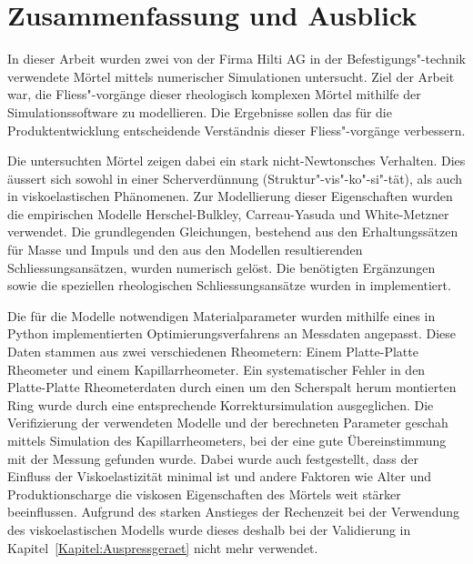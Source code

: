 \section{Zusammenfassung und Ausblick}
\label{Kapitel:Outlook}
In dieser Arbeit wurden zwei von der Firma Hilti AG in der Befestigungs"-technik verwendete Mörtel mittels numerischer Simulationen untersucht.
Ziel der Arbeit war, die Fliess"-vorgänge dieser rheologisch komplexen Mörtel mithilfe der Simulationssoftware \openfoam{} zu modellieren. Die Ergebnisse sollen das für die Produktentwicklung entscheidende Verständnis dieser Fliess"-vorgänge verbessern.

Die untersuchten Mörtel zeigen dabei ein stark nicht-Newtonsches Verhalten.
Dies äussert sich sowohl in einer Scherverdünnung (Struktur"-vis"-ko"-si"-tät), als auch in viskoelastischen Phänomenen. Zur Modellierung dieser Eigenschaften wurden die empirischen Modelle Herschel-Bulkley, Carreau-Yasuda und White-Metzner verwendet.
Die grundlegenden Gleichungen, bestehend aus den Erhaltungssätzen für Masse und Impuls und den aus den Modellen resultierenden Schliessungsansätzen, wurden numerisch gelöst. Die benötigten Ergänzungen sowie die speziellen rheologischen Schliessungsansätze wurden in \openfoam{} implementiert.

Die für die Modelle notwendigen Materialparameter wurden mithilfe eines in Python implementierten Optimierungsverfahrens an Messdaten angepasst. Diese Daten stammen aus zwei verschiedenen Rheometern: Einem Platte-Platte Rheometer und einem Kapillarrheometer.
Ein systematischer Fehler in den Platte-Platte Rheometerdaten durch einen um den Scherspalt herum montierten Ring wurde durch eine entsprechende Korrektursimulation ausgeglichen.
Die Verifizierung der verwendeten Modelle und der berechneten Parameter geschah mittels Simulation des Kapillarrheometers, bei der eine gute Übereinstimmung mit der Messung gefunden wurde.
Dabei wurde auch festgestellt, dass der Einfluss der Viskoelastizität minimal ist und andere Faktoren wie Alter und Produktionscharge die viskosen Eigenschaften des Mörtels weit stärker beeinflussen. 
Aufgrund des starken Anstieges der Rechenzeit bei der Verwendung des viskoelastischen Modells wurde dieses deshalb bei der Validierung in Kapitel~\ref{Kapitel:Auspressgeraet} nicht mehr verwendet.

